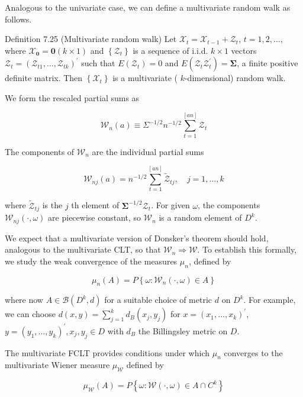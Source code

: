 \documentclass[10pt]{article}
\begin{document}
Analogous to the univariate case, we can define a multivariate random walk as follows.

Definition 7.25 (Multivariate random walk) Let $\mathcal{X}_{t}=\mathcal{X}_{t-1}+\mathcal{Z}_{t}$, $t=1,2, \ldots$, where $\boldsymbol{\mathcal { X }}_{\mathbf{0}}=\mathbf{0}(k \times 1)$ and $\left\{\boldsymbol{\mathcal { Z }}_{t}\right\}$ is a sequence of i.i.d. $k \times 1$ vectors $\mathcal{Z}_{t}=\left(\mathcal{Z}_{t 1}, \ldots, \mathcal{Z}_{t k}\right)^{\prime}$ such that $E\left(\mathcal{Z}_{t}\right)=0$ and $E\left(\mathcal{Z}_{t} \mathcal{Z}_{t}^{\prime}\right)=\mathbf{\Sigma}$, a finite positive definite matrix. Then $\left\{\mathcal{X}_{t}\right\}$ is a multivariate ( $k$-dimensional) random walk.

We form the rescaled partial sums as

$$
\mathcal{W}_{n}(a) \equiv \Sigma^{-1 / 2} n^{-1 / 2} \sum_{t=1}^{[a n]} \mathcal{Z}_{t}
$$

The components of $\mathcal{W}_{n}$ are the individual partial sums

$$
\mathcal{W}_{n j}(a)=n^{-1 / 2} \sum_{t=1}^{[a n]} \tilde{\mathcal{Z}}_{t j}, \quad j=1, \ldots, k
$$

where $\tilde{\mathcal{Z}}_{t j}$ is the $j$ th element of $\boldsymbol{\Sigma}^{-1 / 2} \boldsymbol{\mathcal { Z }}_{t}$. For given $\omega$, the components $\mathcal{W}_{n j}(\cdot, \omega)$ are piecewise constant, so $\mathcal{W}_{n}$ is a random element of $D^{k}$.

We expect that a multivariate version of Donsker's theorem should hold, analogous to the multivariate CLT, so that $\mathcal{W}_{n} \Rightarrow \mathcal{W}$. To establish this formally, we study the weak convergence of the measures $\mu_{n}$, defined by

$$
\mu_{n}(A)=P\left\{\omega: \mathcal{W}_{n}(\cdot, \omega) \in A\right\}
$$

where now $A \in \mathcal{B}\left(D^{k}, d\right)$ for a suitable choice of metric $d$ on $D^{k}$. For example, we can choose $d(x, y)=\sum_{j=1}^{k} d_{B}\left(x_{j}, y_{j}\right)$ for $x=\left(x_{1}, \ldots, x_{k}\right)^{\prime}$, $y=\left(y_{1}, \ldots, y_{k}\right)^{\prime}, x_{j}, y_{j} \in D$ with $d_{B}$ the Billingsley metric on $D$.

The multivariate FCLT provides conditions under which $\mu_{n}$ converges to the multivariate Wiener measure $\mu_{\mathcal{W}}$ defined by

$$
\mu_{\mathcal{W}}(A)=P\left\{\omega: \mathcal{W}(\cdot, \omega) \in A \cap C^{k}\right\}
$$
\end{document}
